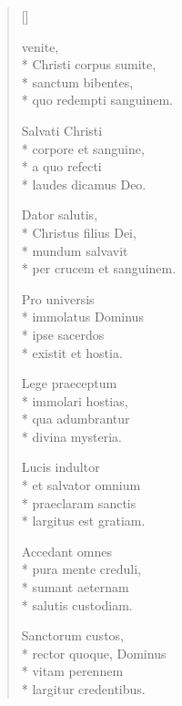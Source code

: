 \newHymn

\settowidth{\versewidth}{Christi corpus sumite}


\begin{multicols}{2}
\begin{verse}[\versewidth]

 venite,\\*
Christi corpus sumite,\\*
sanctum bibentes,\\*
quo redempti sanguinem.

\pointtrans

Salvati Christi\\*
corpore et sanguine,\\*
a quo refecti\\*
laudes dicamus Deo.

Dator salutis,\\*
Christus filius Dei,\\*
mundum salvavit\\*
per crucem et sanguinem.

Pro universis\\*
immolatus Dominus\\*
ipse sacerdos\\*
existit et hostia.

Lege praeceptum\\*
immolari hostias,\\*
qua adumbrantur\\*
divina mysteria.

Lucis indultor\\*
et salvator omnium\\*
praeclaram sanctis\\*
largitus est gratiam.

Accedant omnes\\*
pura mente creduli,\\*
sumant aeternam\\*
salutis custodiam.

Sanctorum custos,\\*
rector quoque, Dominus\\*
vitam perennem\\*
largitur credentibus.

\end{verse}
\end{multicols}

